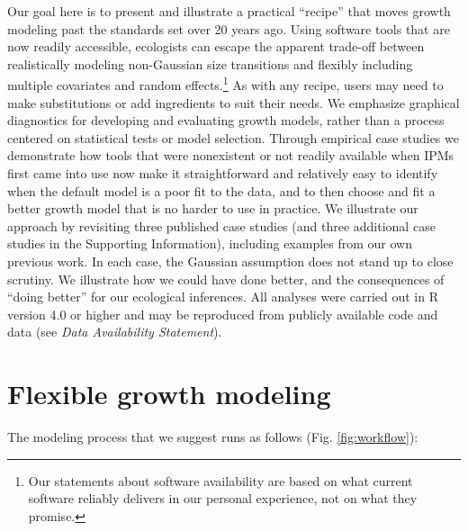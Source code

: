\documentclass[12pt]{article}
\begin{document}
\begin{spacing}{1.9}
Our goal here is to present and illustrate a practical ``recipe'' that moves growth modeling past the standards set over 20 years ago. 
Using software tools that are now readily accessible, ecologists can escape the apparent trade-off between realistically modeling non-Gaussian size transitions and flexibly including multiple covariates and random effects.\footnote{Our statements about software availability are based on what current software reliably delivers in our personal experience, not on what they promise.} 
As with any recipe, users may need to make substitutions or add ingredients to suit their needs. 
We emphasize graphical diagnostics for developing and evaluating growth models, rather than a process centered on statistical tests or model selection. 
Through empirical case studies we demonstrate how tools that were nonexistent or not readily available when IPMs first came into use now make it straightforward and relatively easy to identify when the default model is a poor fit to the data, and to then choose and fit a better growth model that is no harder to use in practice. 
We illustrate our approach by revisiting three published case studies (and three additional case studies in the Supporting Information), including examples from our own previous work.
In each case, the Gaussian assumption does not stand up to close scrutiny. 
We illustrate how we could have done better, and the consequences of ``doing better'' for our ecological inferences. 
All analyses were carried out in R \citep{r-core} version 4.0 or higher and may be reproduced from publicly available code and data (see \emph{Data Availability Statement}). 

\section{Flexible growth modeling}
The modeling process that we suggest runs as follows (Fig. \ref{fig:workflow}):

\end{spacing}
\end{document}
